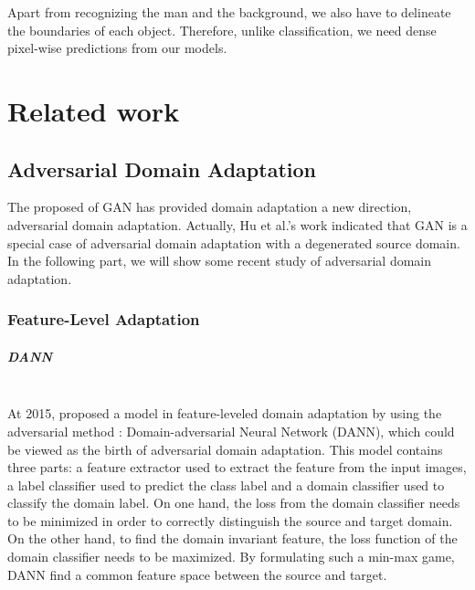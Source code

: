 \documentclass{kththesis}
\begin{document}
\noindent Apart from recognizing the man and the background, we also have to delineate the boundaries of each object. Therefore, unlike classification, we need dense pixel-wise predictions from our models.

\chapter{Related work}


\section{Adversarial Domain Adaptation}

The proposed of GAN\cite{goodfellow2014generative} has provided domain adaptation a new direction, adversarial domain adaptation. Actually, Hu et al.'s \cite{hu2017unifying} work indicated that GAN is a special case of adversarial domain adaptation with a degenerated source domain. In the following part, we will show some recent study of adversarial domain adaptation.

\subsection{Feature-Level Adaptation}

\paragraph{DANN}~{}\\


\noindent At 2015, \cite{ganin2015unsupervised,ganin2016domain} proposed a model in feature-leveled domain adaptation by using the adversarial method \cite{goodfellow2014generative}: Domain-adversarial Neural Network (DANN), which could be viewed as the birth of adversarial domain adaptation. This model contains three parts: a feature extractor used to extract the feature from the input images, a label classifier used to predict the class label and a domain classifier used to classify the domain label. On one hand, the loss from the domain classifier needs to be minimized in order to correctly distinguish the source and target domain. On the other hand, to find the domain invariant feature, the loss function of the domain classifier needs to be maximized. By formulating such a min-max game, DANN find a common feature space between the source and target. 
\end{document}

